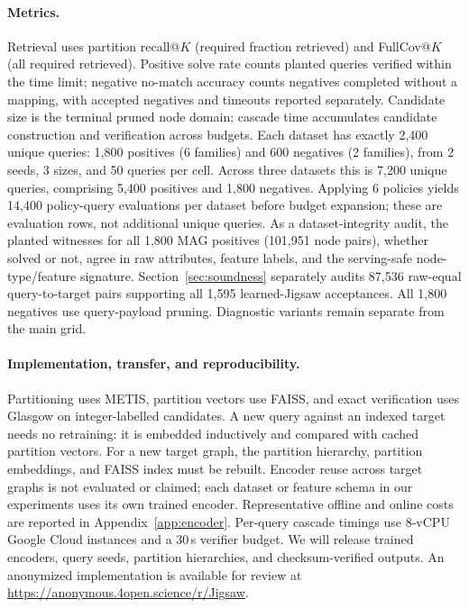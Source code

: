 \documentclass{article}
\begin{document}
\paragraph{Metrics.}
Retrieval uses partition recall@$K$ (required fraction retrieved) and FullCov@$K$ (all required retrieved). Positive solve rate counts planted queries verified within the time limit; negative no-match accuracy counts negatives completed without a mapping, with accepted negatives and timeouts reported separately. Candidate size is the terminal pruned node domain; cascade time accumulates candidate construction and verification across budgets. Each dataset has exactly 2,400 unique queries: 1,800 positives (6 families) and 600 negatives (2 families), from 2 seeds, 3 sizes, and 50 queries per cell. Across three datasets this is 7,200 unique queries, comprising 5,400 positives and 1,800 negatives. Applying 6 policies yields 14,400 policy-query evaluations per dataset before budget expansion; these are evaluation rows, not additional unique queries. As a dataset-integrity audit, the planted witnesses for all 1,800 MAG positives (101,951 node pairs), whether solved or not, agree in raw attributes, feature labels, and the serving-safe node-type/feature signature. Section~\ref{sec:soundness} separately audits 87,536 raw-equal query-to-target pairs supporting all 1,595 learned-Jigsaw acceptances. All 1,800 negatives use query-payload pruning. Diagnostic variants remain separate from the main grid.

\paragraph{Implementation, transfer, and reproducibility.} Partitioning uses METIS, partition vectors use FAISS, and exact verification uses Glasgow on integer-labelled candidates. A new query against an indexed target needs no retraining: it is embedded inductively and compared with cached partition vectors. For a new target graph, the partition hierarchy, partition embeddings, and FAISS index must be rebuilt. Encoder reuse across target graphs is not evaluated or claimed; each dataset or feature schema in our experiments uses its own trained encoder. Representative offline and online costs are reported in Appendix~\ref{app:encoder}. Per-query cascade timings use 8-vCPU Google Cloud instances and a $30$\,s verifier budget. We will release trained encoders, query seeds, partition hierarchies, and checksum-verified outputs. An anonymized implementation is available for review at \url{https://anonymous.4open.science/r/Jigsaw}.
\end{document}
